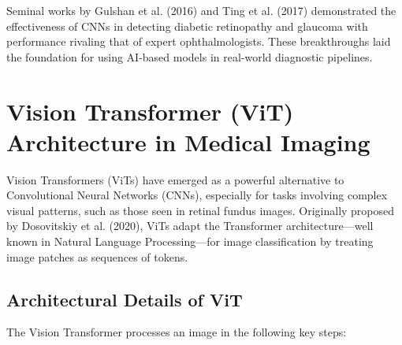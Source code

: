 \documentclass[a4paper,12pt]{report}
\begin{document}
Seminal works by Gulshan et al. (2016) and Ting et al. (2017) demonstrated the effectiveness of CNNs in detecting diabetic retinopathy and glaucoma with performance rivaling that of expert ophthalmologists. These breakthroughs laid the foundation for using AI-based models in real-world diagnostic pipelines.

\section{Vision Transformer (ViT) Architecture in Medical Imaging}

Vision Transformers (ViTs) have emerged as a powerful alternative to Convolutional Neural Networks (CNNs), especially for tasks involving complex visual patterns, such as those seen in retinal fundus images. Originally proposed by Dosovitskiy et al. (2020), ViTs adapt the Transformer architecture—well known in Natural Language Processing—for image classification by treating image patches as sequences of tokens.

\subsection{Architectural Details of ViT}

The Vision Transformer processes an image in the following key steps:
\end{document}
